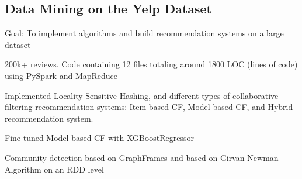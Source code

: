 \documentclass[11pt]{article}
\begin{document}


\vspace{0.1in}

\subsection*{Data Mining on the Yelp Dataset \hfill {}}
\noindent
Goal: To implement algorithms and build recommendation systems on a large dataset
\begin{compactitem}
	\item 200k+ reviews. Code containing 12 files totaling around 1800 LOC (lines of code) using PySpark and MapReduce
	\item Implemented Locality Sensitive Hashing, and different types of collaborative-filtering recommendation systems: Item-based CF, Model-based CF, and Hybrid recommendation system. 
    \item Fine-tuned Model-based CF with XGBoostRegressor
	\item Community detection based on GraphFrames and based on Girvan-Newman Algorithm on an RDD level
\end{compactitem}
\end{document}
